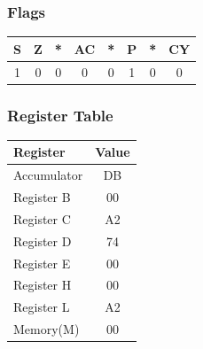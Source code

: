 \documentclass[]{report}
\begin{document}
\subsubsection{Flags}
\begin{tabular}{cccccccc}
\hline
    S & Z & *  & AC & *  & P & *  & CY  \\
    \hline
    1&0&0&0&0&1&0&0\\
    \hline
\end{tabular}
\subsubsection {Register Table}
\begin{tabular}{lc}
    \hline
    Register & Value\\
    \hline
    Accumulator     & DB            \\
    Register B      &  00        \\
    Register C      &  A2        \\
    Register D      &   74       \\
    Register E      &   00       \\
    Register H      &  00        \\
    Register L      &  A2         \\
    Memory(M)       &      00         \\
    \hline
\end{tabular}
\end{document}
